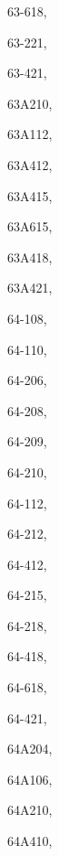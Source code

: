 \documentclass[11pt]{book}
\begin{document}
\begin{theindex}
 \item 63-618, \hyperref[s63-209]{\pageref{s63-209}}
 \item 63-221, \hyperref[s63-209]{\pageref{s63-209}}
 \item 63-421, \hyperref[s63-209]{\pageref{s63-209}}
 \item 63A210, \hyperref[s63A210]{\pageref{s63A210}}
 \item 63A112, \hyperref[s63A112]{\pageref{s63A112}}
 \item 63A412, \hyperref[s63A412]{\pageref{s63A412}}
 \item 63A415, \hyperref[s63A415]{\pageref{s63A415}}
 \item 63A615, \hyperref[s63A615]{\pageref{s63A615}}
 \item 63A418, \hyperref[s63A418]{\pageref{s63A418}}
 \item 63A421, \hyperref[s63A421]{\pageref{s63A421}}
 \item 64-108, \hyperref[s64-108]{\pageref{s64-108}}
 \item 64-110, \hyperref[s64-110]{\pageref{s64-110}}
 \item 64-206, \hyperref[s64-206]{\pageref{s64-206}}
 \item 64-208, \hyperref[s64-208]{\pageref{s64-208}}
 \item 64-209, \hyperref[s64-209]{\pageref{s64-209}}
 \item 64-210, \hyperref[s64-210]{\pageref{s64-210}}
 \item 64-112, \hyperref[s64-112]{\pageref{s64-112}}
 \item 64-212, \hyperref[s64-212]{\pageref{s64-212}}
 \item 64-412, \hyperref[s64-412]{\pageref{s64-412}}
 \item 64-215, \hyperref[s64-215]{\pageref{s64-215}}
 \item 64-218, \hyperref[s64-218]{\pageref{s64-218}}
 \item 64-418, \hyperref[s64-418]{\pageref{s64-418}}
 \item 64-618, \hyperref[s64-618]{\pageref{s63-618}}
 \item 64-421, \hyperref[s64-421]{\pageref{s64-421}}
 \item 64A204, \hyperref[s64A204]{\pageref{s64A204}}
 \item 64A106, \hyperref[s64A106]{\pageref{s64A106}}
 \item 64A210, \hyperref[s64A210]{\pageref{s64A218}}
 \item 64A410, \hyperref[s64A410]{\pageref{s64A410}}

\end{theindex}
\end{document}
